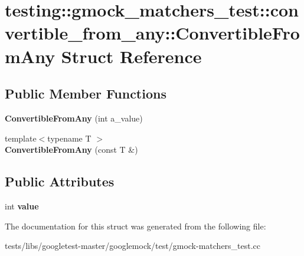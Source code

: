 \hypertarget{structtesting_1_1gmock__matchers__test_1_1convertible__from__any_1_1ConvertibleFromAny}{}\section{testing\+:\+:gmock\+\_\+matchers\+\_\+test\+:\+:convertible\+\_\+from\+\_\+any\+:\+:Convertible\+From\+Any Struct Reference}
\label{structtesting_1_1gmock__matchers__test_1_1convertible__from__any_1_1ConvertibleFromAny}
\subsection*{Public Member Functions}
\begin{DoxyCompactItemize}
\item 
\mbox{\label{structtesting_1_1gmock__matchers__test_1_1convertible__from__any_1_1ConvertibleFromAny_a5bee1e70fa860c1219928f82006e2b2b}} 
{\bfseries Convertible\+From\+Any} (int a\+\_\+value)
\item 
\mbox{\label{structtesting_1_1gmock__matchers__test_1_1convertible__from__any_1_1ConvertibleFromAny_a1192b2a272c6ce8e6fc75a9448417a4f}} 
{\footnotesize template$<$typename T $>$ }\\{\bfseries Convertible\+From\+Any} (const T \&)
\end{DoxyCompactItemize}
\subsection*{Public Attributes}
\begin{DoxyCompactItemize}
\item 
\mbox{\label{structtesting_1_1gmock__matchers__test_1_1convertible__from__any_1_1ConvertibleFromAny_a4fdd0c9f00eced05d2af01b3cf28889f}} 
int {\bfseries value}
\end{DoxyCompactItemize}


The documentation for this struct was generated from the following file\+:\begin{DoxyCompactItemize}
\item 
tests/libs/googletest-\/master/googlemock/test/gmock-\/matchers\+\_\+test.\+cc\end{DoxyCompactItemize}
